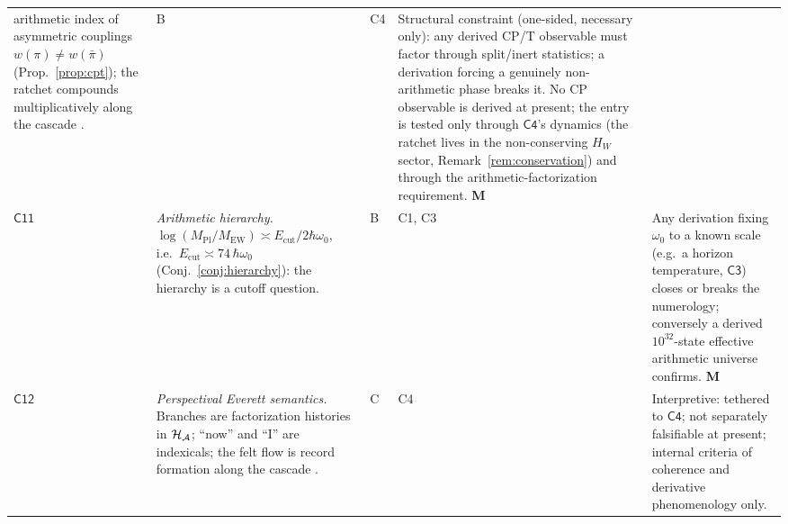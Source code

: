 \begin{longtable}{@{}p{}p{}p{}p{}p{}@{}}
arithmetic index of asymmetric couplings $w(\pi)\neq w(\bar\pi)$
(Prop.~\ref{prop:cpt}); the ratchet compounds multiplicatively along the cascade
\cite{vaccaro2016}. &
B &
C4 &
Structural constraint (one-sided, necessary only): any derived CP/T observable must factor
through split/inert statistics; a derivation forcing a genuinely non-arithmetic phase breaks
it. No CP observable is derived at present; the entry is tested only through $\mathsf{C4}$'s
dynamics (the ratchet lives in the non-conserving $H_{W}$ sector,
Remark~\ref{rem:conservation}) and through the arithmetic-factorization requirement. \textbf{M}\\
$\mathsf{C11}$ &
\emph{Arithmetic hierarchy.} $\log(M_{\mathrm{Pl}}/M_{\mathrm{EW}})\asymp
E_{\mathrm{cut}}/2\hbar\omega_{0}$, i.e.\ $E_{\mathrm{cut}}\asymp74\,\hbar\omega_{0}$
(Conj.~\ref{conj:hierarchy}): the hierarchy is a cutoff question. &
B &
C1, C3 &
Any derivation fixing $\omega_{0}$ to a known scale (e.g.\ a horizon temperature,
$\mathsf{C3}$) closes or breaks the numerology; conversely a derived
$10^{32}$-state effective arithmetic universe confirms. \textbf{M}\\
$\mathsf{C12}$ &
\emph{Perspectival Everett semantics.} Branches are factorization histories in
$\mathcal{H}_{\mathcal{A}}$; ``now'' and ``I'' are indexicals; the felt flow is record formation
along the cascade \cite{wallace2012,kaplan1989}. &
C &
C4 &
Interpretive: tethered to $\mathsf{C4}$; not separately falsifiable at present;
internal criteria of coherence and derivative phenomenology only.\\
\end{longtable}

